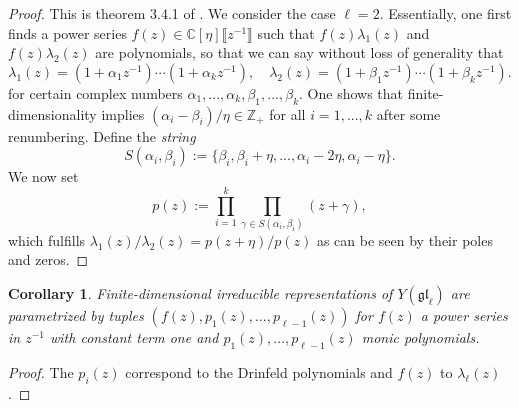 \documentclass[11pt]{report}
\newtheorem{corollary}[theorem]{Corollary}
\theoremstyle{definition}
\theoremstyle{remark}
\theoremstyle{remark}
\newcommand{\Z}{\mathbb{Z}}
\newcommand{\C}{\mathbb{C}}
\begin{document}
\begin{proof}
This is theorem 3.4.1 of \cite{book:molev}. We consider the case $\ell = 2$. Essentially, one first finds a power series $f(z) \in \C[\eta]\llbracket z^{-1} \rrbracket$ such that $f(z) \lambda_1(z)$ and $f(z) \lambda_2(z)$ are polynomials, so that we can say without loss of generality that
\begin{equation*}
\lambda_1(z) = (1+\alpha_1 z^{-1}) \cdots (1+\alpha_k z^{-1}), \quad \lambda_2(z) = (1+\beta_1 z^{-1}) \cdots (1+\beta_k z^{-1}).
\end{equation*}
for certain complex numbers $\alpha_1,...,\alpha_k,\beta_1,...,\beta_k$. One shows that finite-dimensionality implies $(\alpha_i - \beta_i)/\eta \in \Z_+$ for all $i=1,...,k$ after some renumbering. Define the \emph{string}
\begin{equation*}
S(\alpha_i,\beta_i) := \{ \beta_i, \beta_i+\eta, ..., \alpha_i-2\eta, \alpha_i-\eta \}.
\end{equation*}
We now set
\begin{equation*}
p(z) := \prod_{i=1}^k \prod_{\gamma \in S(\alpha_i,\beta_i)} (z + \gamma),
\end{equation*}
which fulfills $\lambda_1(z) / \lambda_2(z) = p(z+\eta) / p(z)$ as can be seen by their poles and zeros.
\end{proof}

\begin{corollary}
Finite-dimensional irreducible representations of $Y(\mathfrak{gl}_\ell)$ are parametrized by tuples $(f(z),p_1(z),...,p_{\ell-1}(z))$ for $f(z)$ a power series in $z^{-1}$ with constant term one and $p_1(z),...,p_{\ell-1}(z)$ monic polynomials.
\end{corollary}

\begin{proof}
The $p_i(z)$ correspond to the Drinfeld polynomials and $f(z)$ to $\lambda_\ell(z)$.
\end{proof}
\end{document}
